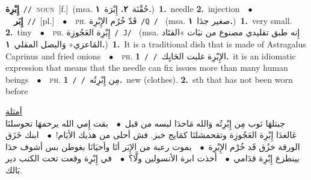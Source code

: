 \documentclass[10pt,a4paper,twoside]{article} %
\begin{document}
\begin{multicols}{2}
{\setlength\topsep{0pt}\textbf{\foreignlanguage{arabic}{إِبْرِة}}\ {\color{gray}\texttt{//}\color{black}}\ \textsc{noun}\ [f.]\ \color{gray}(msa. \foreignlanguage{arabic}{حُقْنَة}~\foreignlanguage{arabic}{\textbf{٢.}}  \foreignlanguage{arabic}{إِبْرَة}~\foreignlanguage{arabic}{\textbf{١.}}\color{black})\ \textbf{1.}~needle  \textbf{2.}~injection\ \ $\bullet$\ \ \setlength\topsep{0pt}\textbf{\foreignlanguage{arabic}{إِبَر}}\ {\color{gray}\texttt{//}\color{black}}\ [pl.]\ \ $\bullet$\ \ \textsc{ph.} \color{gray} \foreignlanguage{arabic}{قَدّ خُرُم الإِبْرِة}\color{black}\ {\color{gray}\texttt{/Q  /}\color{black}}\ \color{gray} (msa. \foreignlanguage{arabic}{صغير جدَا}~\foreignlanguage{arabic}{\textbf{١.}})\color{black}\ \textbf{1.}~very small.  \textbf{2.}~tiny\ \ $\bullet$\ \ \textsc{ph.} \color{gray} \foreignlanguage{arabic}{إِبْرِة العَجُوزِة}\color{black}\ {\color{gray}\texttt{/ J/}\color{black}}\ \color{gray} (msa. \foreignlanguage{arabic}{إِنه طبق تقليدي مصنوع من نبَات »القتَاد المَاعزي« وَالبصل المقلي}~\foreignlanguage{arabic}{\textbf{١.}})\color{black}\ \textbf{1.}~It is a traditional dish that is made of Astragalus Caprinus and fried onions\ \ $\bullet$\ \ \textsc{ph.} \color{gray} \foreignlanguage{arabic}{الإِبْرِة غلبت الحَايِك}\color{black}\ {\color{gray}\texttt{/  /}\color{black}}\ \textbf{1.}~it is an idiomatic expression that means that the needle can fix issues more than many human beings\ \ $\bullet$\ \ \textsc{ph.} \color{gray} \foreignlanguage{arabic}{مِن إِبْرِتُه}\color{black}\ {\color{gray}\texttt{/ /}\color{black}}\ \textbf{1.}~new (clothes).  \textbf{2.}~sth that has not been worn before\  \begin{flushright}\color{lightgray}\underline{\foreignlanguage{arabic}{أمثلة}}\\\noindent \foreignlanguage{arabic}{جبتلهَا ثوب مِن إِبْرِتُه وَالله مَاحدَا لبسه من قبل\ $\bullet$\ \  بقت إِمي الله يرحمهَا تحوسلنَا عَالغدَا إِبْرِة العَجُوزِة وتقحمشلنَا كمَايج خبز. فش أحلى من هذيك الأيَام!\ $\bullet$\ \  ابنك خَزَق الورقة خزُق قَد خُرْم الإِبْرِة\ $\bullet$\ \  بموت رعبة من الإِبَر أنَا وأحيَانَا بغوطن بس أشوف حدَا بينطزع إِبْرِة قدَامي\ $\bullet$\ \  أخذت ابرة الأنسولين ولَّا؟\ $\bullet$\ \  في إِبْرِة وقعت تحت الكنب دير بَالك.}\end{flushright}\color{black}} \vspace{2mm}


\end{multicols}
\end{document}
